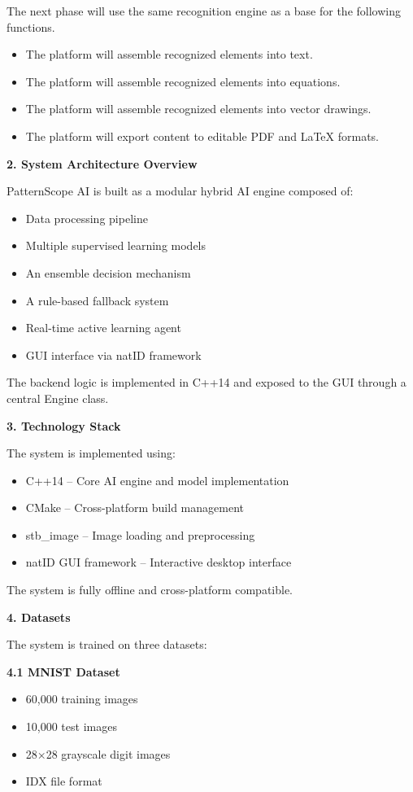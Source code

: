 \documentclass[9pt,a4paper]{extarticle}
\newcommand{\Sec}[1]{\vspace{2pt}\noindent\textbf{#1}\par\vspace{2pt}}
\newcommand{\Sub}[1]{\vspace{2pt}\noindent\textbf{#1}\par\vspace{1pt}}
\begin{document}
The next phase will use the same recognition engine as a base for the following functions.
\begin{itemize}
\item The platform will assemble recognized elements into text.
\item The platform will assemble recognized elements into equations.
\item The platform will assemble recognized elements into vector drawings.
\item The platform will export content to editable PDF and LaTeX formats.
\end{itemize}
\newpage

\Sec{2. System Architecture Overview}
PatternScope AI is built as a modular hybrid AI engine composed of:
\begin{itemize}
\item Data processing pipeline
\item Multiple supervised learning models
\item An ensemble decision mechanism
\item A rule-based fallback system
\item Real-time active learning agent
\item GUI interface via natID framework
\end{itemize}
The backend logic is implemented in C++14 and exposed to the GUI through a central Engine class.

\Sec{3. Technology Stack}
The system is implemented using:
\begin{itemize}
\item C++14 – Core AI engine and model implementation
\item CMake – Cross-platform build management
\item stb\_image – Image loading and preprocessing
\item natID GUI framework – Interactive desktop interface
\end{itemize}
The system is fully offline and cross-platform compatible.

\Sec{4. Datasets}
The system is trained on three datasets:

\Sub{4.1 MNIST Dataset}
\begin{itemize}
\item 60,000 training images
\item 10,000 test images
\item 28×28 grayscale digit images
\item IDX file format
\end{itemize}
\end{document}
